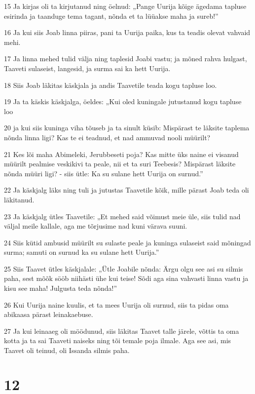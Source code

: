 \par 15 Ja kirjas oli ta kirjutanud ning öelnud: „Pange Uurija kõige ägedama tapluse esirinda ja taanduge tema tagant, nõnda et ta lüüakse maha ja sureb!”
\par 16 Ja kui siis Joab linna piiras, pani ta Uurija paika, kus ta teadis olevat vahvaid mehi.
\par 17 Ja linna mehed tulid välja ning taplesid Joabi vastu; ja mõned rahva hulgast, Taaveti sulaseist, langesid, ja surma sai ka hett Uurija.
\par 18 Siis Joab läkitas käskjala ja andis Taavetile teada kogu tapluse loo.
\par 19 Ja ta käskis käskjalga, öeldes: „Kui oled kuningale jutustanud kogu tapluse loo
\par 20 ja kui siis kuninga viha tõuseb ja ta sinult küsib: Mispärast te läksite taplema nõnda linna ligi? Kas te ei teadnud, et nad ammuvad nooli müürilt?
\par 21 Kes lõi maha Abimeleki, Jerubbeseti poja? Kas mitte üks naine ei visanud müürilt pealmise veskikivi ta peale, nii et ta suri Teebesis? Mispärast läksite nõnda müüri ligi? - siis ütle: Ka su sulane hett Uurija on surnud.”
\par 22 Ja käskjalg läks ning tuli ja jutustas Taavetile kõik, mille pärast Joab teda oli läkitanud.
\par 23 Ja käskjalg ütles Taavetile: „Et mehed said võimust meie üle, siis tulid nad väljal meile kallale, aga me tõrjusime nad kuni värava suuni.
\par 24 Siis kütid ambusid müürilt su sulaste peale ja kuninga sulaseist said mõningad surma; samuti on surnud ka su sulane hett Uurija.”
\par 25 Siis Taavet ütles käskjalale: „Ütle Joabile nõnda: Ärgu olgu see asi su silmis paha, sest mõõk sööb niihästi ühe kui teise! Sõdi aga sina vahvasti linna vastu ja kisu see maha! Julgusta teda nõnda!”
\par 26 Kui Uurija naine kuulis, et ta mees Uurija oli surnud, siis ta pidas oma abikaasa pärast leinakaebuse.
\par 27 Ja kui leinaaeg oli möödunud, siis läkitas Taavet talle järele, võttis ta oma kotta ja ta sai Taaveti naiseks ning tõi temale poja ilmale. Aga see asi, mis Taavet oli teinud, oli Issanda silmis paha.

\chapter{12}

